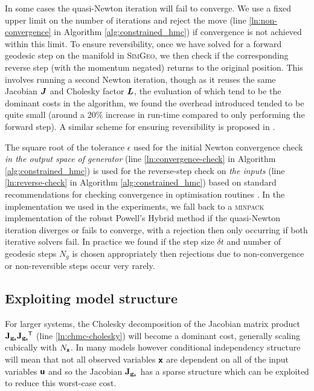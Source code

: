 In some cases the quasi-Newton iteration will fail to converge. We use a fixed upper limit on the number of iterations and reject the move (line \ref{ln:non-convergence} in Algorithm \ref{alg:constrained_hmc}) if convergence is not achieved within this limit. To ensure reversibility, once we have solved for a forward geodesic step on the manifold in \textsc{SimGeo}, we then check if the corresponding reverse step (with the momentum negated) returns to the original position. This involves running a second Newton iteration, though as it reuses the same Jacobian $\boldsymbol{J}$ and Cholesky factor $\boldsymbol{L}$, the evaluation of which tend to be the dominant costs in the algorithm, we found the overhead introduced tended to be quite small (around a 20\% increase in run-time compared to only performing the forward step). A similar scheme for ensuring reversibility is proposed in \citep{zappa2017monte}. 

The square root of the tolerance $\epsilon$ used for the initial Newton convergence check \emph{in the output space of generator} (line \ref{ln:convergence-check} in Algorithm \ref{alg:constrained_hmc}) is used for the reverse-step check on \emph{the inputs} (line \ref{ln:reverse-check} in Algorithm \ref{alg:constrained_hmc}) based on standard recommendations for checking convergence in optimisation routines \citep{christensen2008devil}. In the implementation we used in the experiments, we fall back to a \textsc{minpack} \citep{more1980user} implementation of the robust Powell's Hybrid method \citep{powell1970hybrid} if the quasi-Newton iteration diverges or fails to converge, with a rejection then only occurring if both iterative solvers fail. In practice we found if the step size $\delta t$ and number of geodesic steps $N_g$ is chosen appropriately then rejections due to non-convergence or non-reversible steps occur very rarely.

\subsection{Exploiting model structure}\label{subsec:dgm-exploiting-model-structure}

For larger systems, the Cholesky decomposition of the Jacobian matrix product $\mathbf{J}_{{\mathbf{g}}_{\boldsymbol{\mathsf{x}}}}\mathbf{J}_{{\mathbf{g}}_{\boldsymbol{\mathsf{x}}}}\phantom{}^{\mkern-1.5mu\mathsf{T}}$ (line \ref{ln:chmc-cholesky}) will become a dominant cost, generally scaling cubically with $N_{\boldsymbol{\mathsf{x}}}$. In many models however conditional independency structure will mean that not all observed variables $\boldsymbol{\mathsf{x}}$ are dependent on all of the input variables $\boldsymbol{\mathsf{u}}$ and so the Jacobian $\mathbf{J}_{{\mathbf{g}}_{\boldsymbol{\mathsf{x}}}}$ has a sparse structure which can be exploited to reduce this worst-case cost. 

